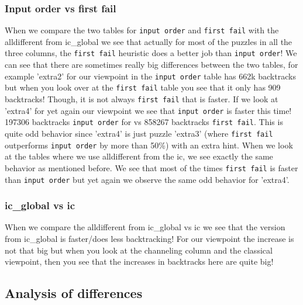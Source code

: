 \documentclass{report}
\begin{document}
\subsubsection{Input order vs first fail}
When we compare the two tables for \texttt{input order} and \texttt{first fail} with the alldifferent from ic\_global we see that actually for most of the puzzles in all the three columns, the \texttt{first fail} heuristic does a better job than \texttt{input order}! We can see that there are sometimes really big differences between the two tables, for example 'extra2' for our viewpoint in the \texttt{input order} table has 662k backtracks but when you look over at the \texttt{first fail} table you see that it only has 909 backtracks! Though, it is not always \texttt{first fail} that is faster. If we look at 'extra4' for yet again our viewpoint we see that \texttt{input order} is faster this time! 197306 backtracks \texttt{input order} for vs 858267 backtracks \texttt{first fail}. This is quite odd behavior since 'extra4' is just puzzle 'extra3' (where \texttt{first fail} outperforms \texttt{input order} by more than 50\%) with an extra hint.
\newline
\newline
When we look at the tables where we use  alldifferent from the ic, we see exactly the same behavior as mentioned before. We see that most of the times \texttt{first fail} is faster than \texttt{input order} but yet again we observe the same odd behavior for 'extra4'.

\subsubsection{ic\_global vs ic}
When we compare the alldifferent from ic\_global vs ic we see that the version from ic\_global is faster/does less backtracking! For our viewpoint the increase is not that big but when you look at the channeling column and the classical viewpoint, then you see that the increases in backtracks here are quite big!

\subsection{Analysis of differences}
\end{document}

